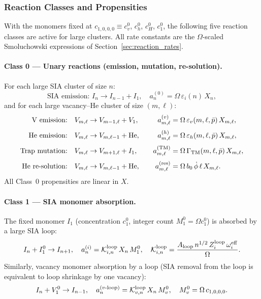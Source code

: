 \subsubsection{Reaction Classes and Propensities}
\label{sec:hybrid_propensities}

With the monomers fixed at $c_{1,0,0,0} \equiv c_v^0$,
$c_h^0$, $c_H^0$, $c_1^0$, the following five reaction classes
are active for large clusters.  All rate constants are the
$\Omega$-scaled Smoluchowski expressions of
Section~\ref{sec:reaction_rates}.

\paragraph{Class 0 --- Unary reactions (emission, mutation,
re-solution).}
For each large SIA cluster of size $n$:
\begin{equation}\label{eq:r0_SIA}
    \text{SIA emission: } I_n \to I_{n-1} + I_1,
    \quad
    a_n^{(0)} = \Omega\,\varepsilon_i(n)\,X_n,
\end{equation}
and for each large vacancy--He cluster of size $(m,\ell)$:
\begin{alignat}{2}
    \text{V emission:} \quad &
    V_{m,\ell} \to V_{m-1,\ell} + V_1,
    \quad &
    a_{m,\ell}^{(v)} &=
    \Omega\,\varepsilon_v(m,\ell,\bar{p})\,X_{m,\ell},
    \label{eq:r0_v}\\[3pt]
    \text{He emission:} \quad &
    V_{m,\ell} \to V_{m,\ell-1} + \mathrm{He},
    \quad &
    a_{m,\ell}^{(h)} &=
    \Omega\,\varepsilon_h(m,\ell,\bar{p})\,X_{m,\ell},
    \label{eq:r0_h}\\[3pt]
    \text{Trap mutation:} \quad &
    V_{m,\ell} \to V_{m+1,\ell} + I_1,
    \quad &
    a_{m,\ell}^{(\rm TM)} &=
    \Omega\,\Gamma_{\rm TM}(m,\ell,\bar{p})\,X_{m,\ell},
    \label{eq:r0_TM}\\[3pt]
    \text{He re-solution:} \quad &
    V_{m,\ell} \to V_{m,\ell-1} + \mathrm{He},
    \quad &
    a_{m,\ell}^{(\rm res)} &=
    \Omega\,b_0\,\dot{\phi}\,\ell\,X_{m,\ell}.
    \label{eq:r0_res}
\end{alignat}
All Class~0 propensities are linear in $X$.

\paragraph{Class 1 --- SIA monomer absorption.}
The fixed monomer $I_1$ (concentration $c_1^0$, integer count
$M_1^0 = \Omega c_1^0$) is absorbed by a large SIA loop:
\begin{equation}\label{eq:r1_SIA}
    I_n + I_1^0 \to I_{n+1},
    \quad
    a_n^{(i)} = \mathcal{K}_{i,n}^{\rm loop}\,X_n\,M_1^0,
    \quad
    \mathcal{K}_{i,n}^{\rm loop}
    = \frac{A_{\rm loop}\,n^{1/2}\,Z_i^{\rm loop}\,\omega_i^{\rm eff}}{\Omega}.
\end{equation}
Similarly, vacancy monomer absorption by a loop (SIA removal from
the loop is equivalent to loop shrinkage by one vacancy):
\begin{equation}\label{eq:r1_SIAv}
    I_n + V_1^0 \to I_{n-1},
    \quad
    a_n^{(v\text{-loop})}
    = \mathcal{K}_{v,n}^{\rm loop}\,X_n\,M_v^0,
    \quad
    M_v^0 = \Omega\,c_{1,0,0,0}.
\end{equation}

